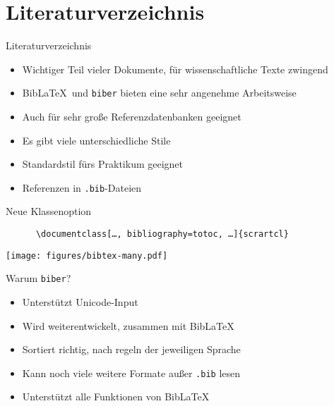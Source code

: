 \section{Literaturverzeichnis}

\begin{frame}[fragile]{Literaturverzeichnis}
  \begin{itemize}
    \item Wichtiger Teil vieler Dokumente, für wissenschaftliche Texte zwingend
    \item Bib\LaTeX\ und \texttt{biber} bieten eine sehr angenehme Arbeitsweise
    \item Auch für sehr große Referenzdatenbanken geeignet
    \item Es gibt viele unterschiedliche Stile
    \item Standardstil fürs Praktikum geeignet
    \item Referenzen in \texttt{.bib}-Dateien
  \end{itemize}
  \begin{block}{Neue Klassenoption}
    \begin{lstlisting}
      \documentclass[…, bibliography=totoc, …]{scrartcl}
    \end{lstlisting}
  \end{block}
\end{frame}

\begin{frame}
  \centering
  \texttt{[image: figures/bibtex-many.pdf]}
\end{frame}

\begin{frame}{Warum \texttt{biber}?}
  \begin{itemize}
    \item Unterstützt Unicode-Input
    \item Wird weiterentwickelt, zusammen mit Bib\LaTeX
    \item Sortiert richtig, nach regeln der jeweiligen Sprache
    \item Kann noch viele weitere Formate außer \texttt{.bib} lesen
    \item Unterstützt alle Funktionen von Bib\LaTeX
  \end{itemize}
\end{frame}

